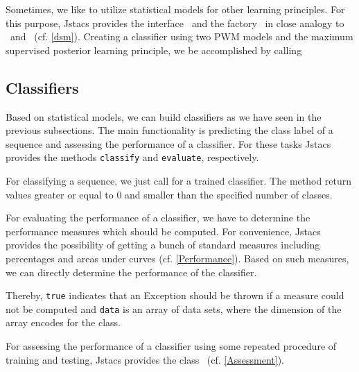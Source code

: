 Sometimes, we like to utilize statistical models for other learning principles. For this purpose, Jstacs provides the interface \DiffSM~and the factory \DiffSMFactory~in close analogy to \TrainSM~and \TrainSMFactory~(cf. \ref{dsm}). Creating a classifier using two PWM models and the maximum supervised posterior learning principle, we be accomplished by calling
\renewcommand{\codefile}{recipes/CreateMSPClassifier.java}
\setcounter{off}{20}

\subsection{Classifiers}

\renewcommand{\codefile}{recipes/TrainClassifier.java}
Based on statistical models, we can build classifiers as we have seen in the previous subsections. The main functionality is predicting the class label of a sequence and assessing the performance of a classifier. For these tasks Jstacs provides the methods \lstinline+classify+ and \lstinline+evaluate+, respectively.

For classifying a sequence, we just call
\setcounter{off}{36}
for a trained classifier. The method return values greater or equal to 0 and smaller than the specified number of classes. 

For evaluating the performance of a classifier, we have to determine the performance measures which should be computed. For convenience, Jstacs provides the possibility of getting a bunch of standard measures including percentages and areas under curves (cf. \ref{Performance}). Based on such measures, we can directly determine the performance of the classifier.
\addtocounter{off}{6}
Thereby, \lstinline+true+ indicates that an Exception should be thrown if a measure could not be computed and \lstinline+data+ is an array of data sets, where the dimension of the array encodes for the class.

For assessing the performance of a classifier using some repeated procedure of training and testing, Jstacs provides the class \ClassifierAssessment~(cf. \ref{Assessment}).

\renewcommand{\codefile}{\defaultcodefile}
\setcounter{off}{1}
